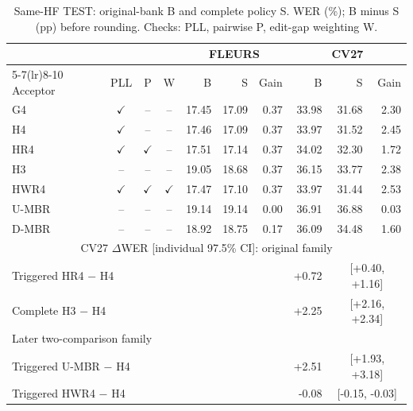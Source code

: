 \begin{table}[!t]\centering\footnotesize
\caption{Same-HF TEST: original-bank B and complete policy S. WER (\%); B minus S (pp) before rounding. Checks: PLL, pairwise P, edit-gap weighting W.}\label{tab:hfacceptors}
\setlength{\tabcolsep}{2pt}\renewcommand{\arraystretch}{1.00}
\begin{tabular}{@{}lcccrrrrrr@{}}\toprule
 & & & & \multicolumn{3}{c}{FLEURS} & \multicolumn{3}{c}{CV27}\\
\cmidrule(lr){5-7}\cmidrule(lr){8-10}
Acceptor & PLL & P & W & B & S & Gain & B & S & Gain\\\midrule
G4 & $\checkmark$ & -- & -- & 17.45 & 17.09 & 0.37 & 33.98 & 31.68 & 2.30\\
H4 & $\checkmark$ & -- & -- & 17.46 & 17.09 & 0.37 & 33.97 & 31.52 & 2.45\\
HR4 & $\checkmark$ & $\checkmark$ & -- & 17.51 & 17.14 & 0.37 & 34.02 & 32.30 & 1.72\\
H3 & -- & -- & -- & 19.05 & 18.68 & 0.37 & 36.15 & 33.77 & 2.38\\
HWR4 & $\checkmark$ & $\checkmark$ & $\checkmark$ & 17.47 & 17.10 & 0.37 & 33.97 & 31.44 & 2.53\\
U-MBR & -- & -- & -- & 19.14 & 19.14 & 0.00 & 36.91 & 36.88 & 0.03\\
D-MBR & -- & -- & -- & 18.92 & 18.75 & 0.17 & 36.09 & 34.48 & 1.60\\
\midrule\multicolumn{10}{c}{CV27 $\Delta$WER [individual 97.5\% CI]: original family}\\
\multicolumn{7}{l}{Triggered HR4 $-$ H4} & +0.72 & \multicolumn{2}{c}{[+0.40, +1.16]}\\
\multicolumn{7}{l}{Complete H3 $-$ H4} & +2.25 & \multicolumn{2}{c}{[+2.16, +2.34]}\\
\multicolumn{10}{l}{Later two-comparison family}\\
\multicolumn{7}{l}{Triggered U-MBR $-$ H4} & +2.51 & \multicolumn{2}{c}{[+1.93, +3.18]}\\
\multicolumn{7}{l}{Triggered HWR4 $-$ H4} & -0.08 & \multicolumn{2}{c}{[-0.15, -0.03]}\\
\bottomrule\end{tabular}\end{table}
